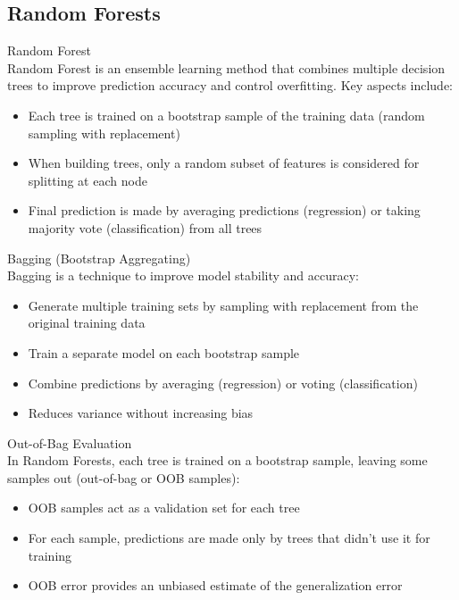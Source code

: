 \subsection{Random Forests}

\begin{definition}{Random Forest}\\
Random Forest is an ensemble learning method that combines multiple decision trees to improve prediction accuracy and control overfitting. Key aspects include:
\begin{itemize}
    \item Each tree is trained on a bootstrap sample of the training data (random sampling with replacement)
    \item When building trees, only a random subset of features is considered for splitting at each node
    \item Final prediction is made by averaging predictions (regression) or taking majority vote (classification) from all trees
\end{itemize}
\end{definition}

\begin{concept}{Bagging (Bootstrap Aggregating)}\\
Bagging is a technique to improve model stability and accuracy:
\begin{itemize}
    \item Generate multiple training sets by sampling with replacement from the original training data
    \item Train a separate model on each bootstrap sample
    \item Combine predictions by averaging (regression) or voting (classification)
    \item Reduces variance without increasing bias
\end{itemize}
\end{concept}

\begin{concept}{Out-of-Bag Evaluation}\\
In Random Forests, each tree is trained on a bootstrap sample, leaving some samples out (out-of-bag or OOB samples):
\begin{itemize}
    \item OOB samples act as a validation set for each tree
    \item For each sample, predictions are made only by trees that didn't use it for training
    \item OOB error provides an unbiased estimate of the generalization error
\end{itemize}
\end{concept}

